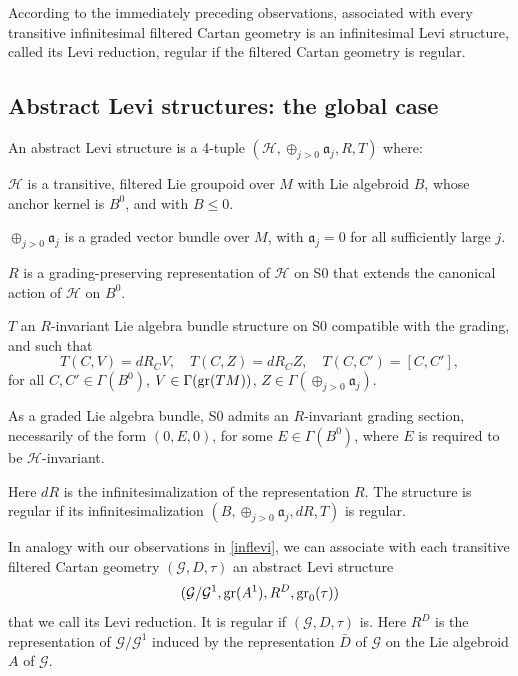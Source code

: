 \documentclass[leqno,12pt]{amsart} %
\begin{document}
According to the immediately preceding observations, associated with every transitive
infinitesimal filtered Cartan geometry is an infinitesimal Levi structure, called its {\df
  Levi reduction}, regular if the filtered Cartan geometry is regular.

\subsection{Abstract Levi structures: the global case}\label{abstract_levi}%
\mbox{}\newline
\noindent%
An {\df abstract Levi structure} is a 4-tuple
$({\mathcal H}, \oplus_{j>0}{\mathfrak a}_j, R, T)$ where:
\begin{conditions}
  \item ${\mathcal H} $ is a transitive, filtered Lie groupoid over $M$ with Lie algebroid
    $B$, whose anchor kernel is $B^0$, and with $B \le 0$.
  \item $\oplus_{j>0}{\mathfrak a}_j$ is a graded vector bundle over $M$, with
    ${\mathfrak a}_j=0$ for all sufficiently large $j$.
  \item $R$ is a grading-preserving representation of ${\mathcal H}$ on
    S0 that extends the canonical action of ${\mathcal H}$ on $B^0$.
   \item\label{chh00} $T$ an $R$-invariant Lie algebra bundle structure on
    S0 compatible with the grading, and such that
    \begin{equation*}
      T(C, V) = dR_C V,\quad
      T(C, Z) = dR_C Z,\quad
      T(C, C') = [C,C'],
    \end{equation*}
    for all $C,C'\in\Gamma(B^0)$, $V\in \Gamma(\operatorname{\operatorname{gr}}(TM))$,
    $Z \in \Gamma(\oplus_{j>0} {\mathfrak a}_j)$.
  \item\label{five} As a graded Lie algebra bundle, S0 admits an $R$-invariant grading
    section, necessarily of the form $(0, E, 0)$, for some $E \in \Gamma(B^0)$, where $E$
    is required to be ${\mathcal H} $-invariant.
\end{conditions}
Here $dR$ is the infinitesimalization of the representation $R$. The structure is {\df
  regular} if its infinitesimalization $(B,\oplus_{j>0}{\mathfrak a}_j, dR, T)$ is
regular.  %

In analogy with our observations in \ref{inflevi}, we can associate with each transitive
filtered Cartan geometry $({\mathcal G}, D, \tau)$ an abstract Levi structure
$$({\mathcal G}/{\mathcal G}^1, \operatorname{\operatorname{gr}}(A^1), R^D, \operatorname{\operatorname{gr}}_0(\tau))$$ that we call its {\df
  Levi reduction}. It is regular if $({\mathcal G}, D, \tau)$ is. Here $R^D$ is the
representation of ${\mathcal G}/{\mathcal G}^1$ induced by the representation $\bar D$ of
${\mathcal G} $ on the Lie algebroid $A$ of ${\mathcal G} $.
\end{document}
